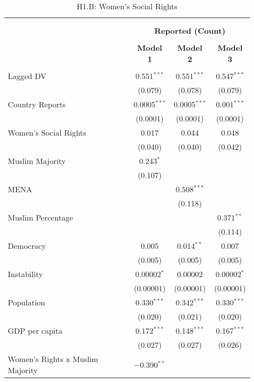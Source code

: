 
\begin{table}[!htbp] \centering 
  \caption{H1.B: Women's Social Rights} 
  \label{} 
\begin{tabular}{@{\extracolsep{5pt}}lccc} 
\\[-1.8ex]\hline \\[-1.8ex] 
\\[-1.8ex] & \multicolumn{3}{c}{\textbf{Reported (Count)}} \\ 
\\[-1.8ex] & \textbf{Model 1} & \textbf{Model 2} & \textbf{Model 3}\\ 
\hline \\[-1.8ex] 
 Lagged DV & 0.551$^{***}$ & 0.551$^{***}$ & 0.547$^{***}$ \\ 
  & (0.079) & (0.078) & (0.079) \\ 
  Country Reports & 0.0005$^{***}$ & 0.0005$^{***}$ & 0.001$^{***}$ \\ 
  & (0.0001) & (0.0001) & (0.0001) \\ 
  Women's Social Rights & 0.017 & 0.044 & 0.048 \\ 
  & (0.040) & (0.040) & (0.042) \\ 
  Muslim Majority & 0.243$^{*}$ &  &  \\ 
  & (0.107) &  &  \\ 
  MENA &  & 0.508$^{***}$ &  \\ 
  &  & (0.118) &  \\ 
  Muslim Percentage &  &  & 0.371$^{**}$ \\ 
  &  &  & (0.114) \\ 
  Democracy & 0.005 & 0.014$^{**}$ & 0.007 \\ 
  & (0.005) & (0.005) & (0.005) \\ 
  Instability & 0.00002$^{*}$ & 0.00002 & 0.00002$^{*}$ \\ 
  & (0.00001) & (0.00001) & (0.00001) \\ 
  Population & 0.330$^{***}$ & 0.342$^{***}$ & 0.330$^{***}$ \\ 
  & (0.020) & (0.021) & (0.020) \\ 
  GDP per capita & 0.172$^{***}$ & 0.148$^{***}$ & 0.167$^{***}$ \\ 
  & (0.027) & (0.027) & (0.026) \\ 
  Women's Rights x Muslim Majority & $-$0.390$^{**}$ &  &  \\ 

\end{tabular}
\end{table}
